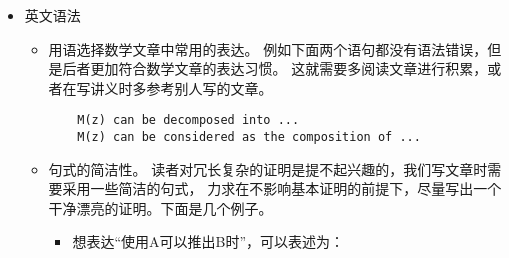 \begin{itemize}
\begin{itemize}
\begin{itemize}
\begin{align}
  		  f_2(x) = x.
  	  \end{align}
  	  \item 当数学公式作为证明环境结尾时，将证明环境结尾的方框插入公式中。例如
  	  \begin{proof}
  		  \begin{displaymath}
  			  \begin{bmatrix}
  				  \alpha & -\beta
  				  \\
  				  \beta & \alpha
  			  \end{bmatrix}^{-1}
  			  =
  			  \frac{1}{\alpha^2+\beta^2}
  			  \begin{bmatrix}
  				  \alpha & \beta
  				  \\
  				  -\beta & \alpha
  			  \end{bmatrix}.
  			  \qedhere
  		  \end{displaymath}
  	  \end{proof}
  	  从源代码角度即在结尾处增加 \lstinline|\qedhere|。
  	  \begin{lstlisting}
	  \begin{proof}
		  \begin{displaymath}
			  ...
			  \qedhere
		  \end{displaymath}
	  \end{proof}
  	  \end{lstlisting}
    \end{itemize}
    \item 为每个定理环境、数学公式提供标签。
    在 \lstinline|theorem|、\lstinline|equation| 等
    环境中加上 \lstinline|\label{...}|，
    在后续引用时就可以直接使用 \lstinline|\ref{...}|，
    体现了数学知识相互的联系与复用。
  \end{itemize}
  \item 英文语法
  \begin{itemize}
  	\item 用语选择数学文章中常用的表达。
  	例如下面两个语句都没有语法错误，但是后者更加符合数学文章的表达习惯。
  	这就需要多阅读文章进行积累，或者在写讲义时多参考别人写的文章。
  	\begin{lstlisting}
  	M(z) can be decomposed into ...
  	M(z) can be considered as the composition of ...
  	\end{lstlisting}
  	\item 句式的简洁性。
  	读者对冗长复杂的证明是提不起兴趣的，我们写文章时需要采用一些简洁的句式，
  	力求在不影响基本证明的前提下，尽量写出一个干净漂亮的证明。下面是几个例子。
  	\begin{itemize}
  		\item 想表达“使用A可以推出B时”，可以表述为： 

\end{itemize}
\end{itemize}
\end{itemize}
